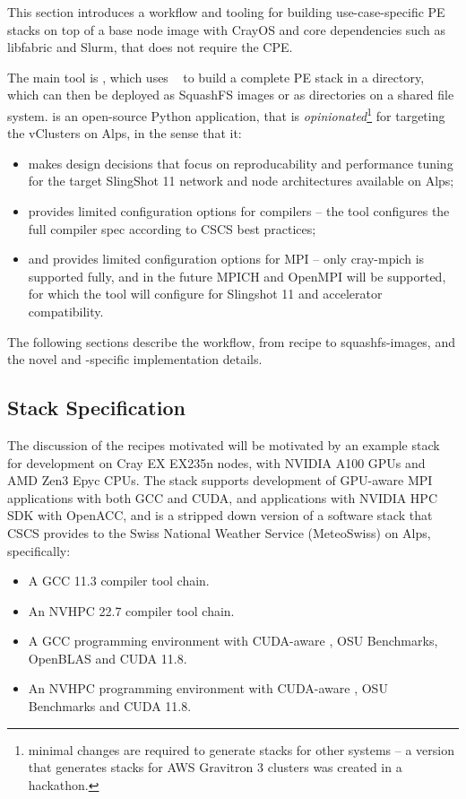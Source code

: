 This section introduces a workflow and tooling for building use-case-specific PE stacks on top of a base node image with CrayOS and core dependencies such as libfabric and Slurm, that does not require the CPE.

The main tool is \href{https://github.com/eth-cscs/stackinator}{\stackinator}, which uses \spack~\cite{gamblin:sc15} to build a complete PE stack in a directory, which can then be deployed as SquashFS images or as directories on a shared file system.
\stackinator is an open-source Python application, that is \emph{opinionated}\footnote{minimal changes are required to generate stacks for other systems -- a version that generates stacks for AWS Gravitron 3 clusters was created in a hackathon.} for targeting the vClusters on Alps, in the sense that it:
\begin{itemize}
    \item makes design decisions that focus on reproducability and performance tuning for the target SlingShot 11 network and node architectures available on Alps;
    \item provides limited configuration options for compilers -- the tool configures the full compiler spec according to CSCS best practices;
    \item and provides limited configuration options for MPI -- only cray-mpich is supported fully, and in the future MPICH and OpenMPI will be supported, for which the tool will configure for Slingshot 11 and accelerator compatibility.
\end{itemize}

The following sections describe the workflow, from recipe to squashfs-images, and the novel and \crayex-specific implementation details.

\subsection{Stack Specification}

The discussion of the \spack recipes motivated will be motivated by an example stack for development on Cray EX EX235n nodes, with NVIDIA A100 GPUs and AMD Zen3 Epyc CPUs.
The stack supports development of GPU-aware MPI applications with both GCC and CUDA, and applications with NVIDIA HPC SDK with OpenACC, and is a stripped down version of a software stack that CSCS provides to the Swiss National Weather Service (MeteoSwiss) on Alps, specifically:
\begin{itemize}
    \item A GCC 11.3 compiler tool chain.
    \item An NVHPC 22.7 compiler tool chain.
    \item A GCC programming environment  with CUDA-aware \craympich, OSU Benchmarks, OpenBLAS and CUDA 11.8.
    \item An NVHPC programming environment  with CUDA-aware \craympich, OSU Benchmarks and CUDA 11.8.
\end{itemize}

